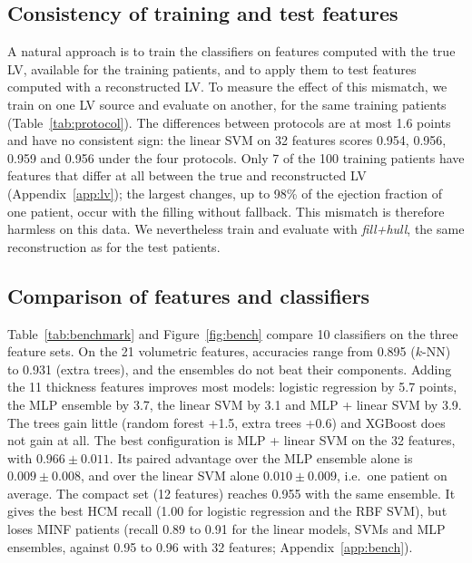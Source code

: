 \subsection{Consistency of training and test features}
\label{sec:protocol}
A natural approach is to train the classifiers on features computed with the true LV, available for the training patients, and to apply them to test features computed with a reconstructed LV. To measure the effect of this mismatch, we train on one LV source and evaluate on another, for the same training patients (Table~\ref{tab:protocol}). The differences between protocols are at most 1.6 points and have no consistent sign: the linear SVM on 32 features scores 0.954, 0.956, 0.959 and 0.956 under the four protocols. Only 7 of the 100 training patients have features that differ at all between the true and reconstructed LV (Appendix~\ref{app:lv}); the largest changes, up to 98\% of the ejection fraction of one patient, occur with the filling without fallback. This mismatch is therefore harmless on this data. We nevertheless train and evaluate with \emph{fill+hull}, the same reconstruction as for the test patients.



\subsection{Comparison of features and classifiers}
\label{sec:bench}
Table~\ref{tab:benchmark} and Figure~\ref{fig:bench} compare 10 classifiers on the three feature sets. On the 21 volumetric features, accuracies range from 0.895 ($k$-NN) to 0.931 (extra trees), and the ensembles do not beat their components. Adding the 11 thickness features improves most models: logistic regression by 5.7 points, the MLP ensemble by 3.7, the linear SVM by 3.1 and MLP + linear SVM by 3.9. The trees gain little (random forest +1.5, extra trees +0.6) and XGBoost does not gain at all. The best configuration is MLP + linear SVM on the 32 features, with $0.966 \pm 0.011$. Its paired advantage over the MLP ensemble alone is $0.009 \pm 0.008$, and over the linear SVM alone $0.010 \pm 0.009$, i.e.\ one patient on average. The compact set (12 features) reaches 0.955 with the same ensemble. It gives the best HCM recall (1.00 for logistic regression and the RBF SVM), but loses MINF patients (recall 0.89 to 0.91 for the linear models, SVMs and MLP ensembles, against 0.95 to 0.96 with 32 features; Appendix~\ref{app:bench}).



